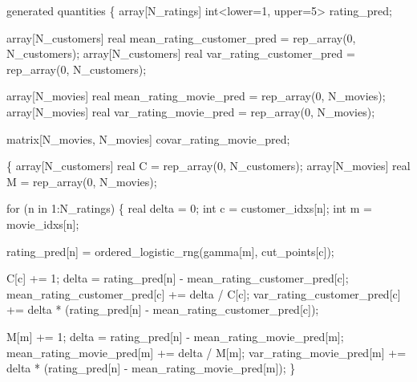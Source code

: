 \documentclass[
  letterpaper,
  DIV=11,
  numbers=noendperiod]{scrartcl}
\newenvironment{Shaded}{\begin{snugshade}}{\end{snugshade}}
\newcommand{\ControlFlowTok}[1]{\textcolor[rgb]{0.00,0.23,0.31}{#1}}
\newcommand{\DataTypeTok}[1]{\textcolor[rgb]{0.68,0.00,0.00}{#1}}
\newcommand{\DecValTok}[1]{\textcolor[rgb]{0.68,0.00,0.00}{#1}}
\newcommand{\KeywordTok}[1]{\textcolor[rgb]{0.00,0.23,0.31}{#1}}
\newcommand{\NormalTok}[1]{\textcolor[rgb]{0.00,0.23,0.31}{#1}}
\begin{document}
\begin{codelisting}
\begin{Shaded}
\begin{Highlighting}[]
\KeywordTok{generated quantities}\NormalTok{ \{}
  \DataTypeTok{array}\NormalTok{[N\_ratings] }\DataTypeTok{int}\NormalTok{\textless{}}\KeywordTok{lower}\NormalTok{=}\DecValTok{1}\NormalTok{, }\KeywordTok{upper}\NormalTok{=}\DecValTok{5}\NormalTok{\textgreater{} rating\_pred;}

  \DataTypeTok{array}\NormalTok{[N\_customers] }\DataTypeTok{real}\NormalTok{ mean\_rating\_customer\_pred}
\NormalTok{    = rep\_array(}\DecValTok{0}\NormalTok{, N\_customers);}
  \DataTypeTok{array}\NormalTok{[N\_customers] }\DataTypeTok{real}\NormalTok{ var\_rating\_customer\_pred}
\NormalTok{    = rep\_array(}\DecValTok{0}\NormalTok{, N\_customers);}

  \DataTypeTok{array}\NormalTok{[N\_movies] }\DataTypeTok{real}\NormalTok{ mean\_rating\_movie\_pred = rep\_array(}\DecValTok{0}\NormalTok{, N\_movies);}
  \DataTypeTok{array}\NormalTok{[N\_movies] }\DataTypeTok{real}\NormalTok{ var\_rating\_movie\_pred = rep\_array(}\DecValTok{0}\NormalTok{, N\_movies);}

  \DataTypeTok{matrix}\NormalTok{[N\_movies, N\_movies] covar\_rating\_movie\_pred;}

\NormalTok{  \{}
    \DataTypeTok{array}\NormalTok{[N\_customers] }\DataTypeTok{real}\NormalTok{ C = rep\_array(}\DecValTok{0}\NormalTok{, N\_customers);}
    \DataTypeTok{array}\NormalTok{[N\_movies] }\DataTypeTok{real}\NormalTok{ M = rep\_array(}\DecValTok{0}\NormalTok{, N\_movies);}

    \ControlFlowTok{for}\NormalTok{ (n }\ControlFlowTok{in} \DecValTok{1}\NormalTok{:N\_ratings) \{}
      \DataTypeTok{real}\NormalTok{ delta = }\DecValTok{0}\NormalTok{;}
      \DataTypeTok{int}\NormalTok{ c = customer\_idxs[n];}
      \DataTypeTok{int}\NormalTok{ m = movie\_idxs[n];}

\NormalTok{      rating\_pred[n] = ordered\_logistic\_rng(gamma[m], cut\_points[c]);}

\NormalTok{      C[c] += }\DecValTok{1}\NormalTok{;}
\NormalTok{      delta = rating\_pred[n] {-} mean\_rating\_customer\_pred[c];}
\NormalTok{      mean\_rating\_customer\_pred[c] += delta / C[c];}
\NormalTok{      var\_rating\_customer\_pred[c]}
\NormalTok{        += delta * (rating\_pred[n] {-} mean\_rating\_customer\_pred[c]);}

\NormalTok{      M[m] += }\DecValTok{1}\NormalTok{;}
\NormalTok{      delta = rating\_pred[n] {-} mean\_rating\_movie\_pred[m];}
\NormalTok{      mean\_rating\_movie\_pred[m] += delta / M[m];}
\NormalTok{      var\_rating\_movie\_pred[m]}
\NormalTok{        += delta * (rating\_pred[n] {-} mean\_rating\_movie\_pred[m]);}
\NormalTok{    \}}


\end{Highlighting}
\end{Shaded}
\end{codelisting}
\end{document}
